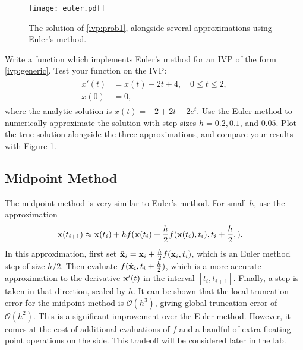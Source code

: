 \begin{figure}[H]
\centering
\texttt{[image: euler.pdf]}
\caption{The solution of \eqref{ivp:prob1}, alongside several approximations using Euler's method.}
\label{ivp:euler}
\end{figure}

\begin{problem} Write a function which implements Euler's method for an IVP of the form \eqref{ivp:generic}. Test your function on the IVP:
\begin{align}
	\begin{split}
		x' (t)&= x(t) - 2t + 4,\quad 0 \leq t \leq 2, \\
		x(0) &= 0,
	\end{split}\label{ivp:prob1}
\end{align}
where the analytic solution is $x(t) = -2+2t + 2e^t.$
Use the Euler method to numerically approximate the solution with step sizes $h = 0.2, 0.1$, and $0.05.$ Plot the true solution alongside the three approximations, and compare your results with Figure \ref{ivp:euler}.
\end{problem}



\subsection*{Midpoint Method}

The midpoint method is very similar to Euler's method.
For small $h$, use the approximation
\begin{align*}
\mathbf{x}(t_{i+1}) &\approx  \mathbf{x}(t_{i}) + h f(\mathbf{x}(t_{i})+\frac{h}{2} f(\mathbf{x}(t_i),t_i),t_{i}+\frac{h}{2},).
\end{align*}
In this approximation, first set $\hat {\mathbf{x}}_i = \mathbf{x}_i+\frac{h}{2}f(\mathbf{x}_i,t_i)$, which is an Euler method step of size $h/2$.
Then evaluate $f(\hat {\mathbf{x}}_i,t_i+\frac{h}{2})$, which is a more accurate approximation to the derivative $\mathbf{x}'(t)$ in the interval $[t_i,t_{i+1}]$.
Finally, a step is taken in that direction, scaled by $h$.
It can be shown that the local truncation error for the midpoint method is $\mathcal{O}(h^3)$, giving global truncation error of $\mathcal{O}(h^2)$.
This is a significant improvement over the Euler method.
However, it comes at the cost of additional evaluations of $f$ and a handful of extra floating point operations on the side.
This tradeoff will be considered later in the lab.

